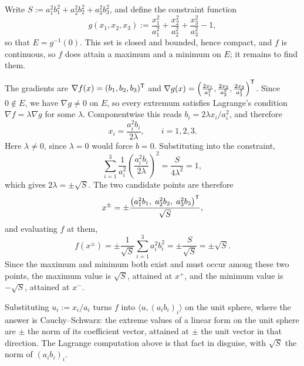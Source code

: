 \begin{exercisesolution}
\label{sol:lagrange_ellipsoid_linear}
Write $S := a_1^2 b_1^2 + a_2^2 b_2^2 + a_3^2 b_3^2$, and define the constraint function
\[g(x_1,x_2,x_3) := \frac{x_1^2}{a_1^2} + \frac{x_2^2}{a_2^2} + \frac{x_3^2}{a_3^2} - 1,\]
so that $E = g^{-1}(0)$. This set is closed and bounded, hence compact, and $f$ is continuous, so
$f$ does attain a maximum and a minimum on $E$; it remains to find them.

The gradients are $\nabla f(x) = (b_1, b_2, b_3)^{\mathsf{T}}$ and $\nabla g(x) = \left(\frac{2x_1}{a_1^2}, \frac{2x_2}{a_2^2}, \frac{2x_3}{a_3^2}\right)^{\mathsf{T}}$.
Since $0 \notin E$, we have $\nabla g \neq 0$ on $E$, so every extremum satisfies Lagrange's
condition $\nabla f = \lambda \nabla g$ for some $\lambda$. Componentwise this reads
$b_i = 2\lambda x_i / a_i^2$, and therefore
\[x_i = \frac{a_i^2 b_i}{2\lambda}, \qquad i = 1,2,3.\]
Here $\lambda \neq 0$, since $\lambda = 0$ would force $b = 0$. Substituting into the constraint,
\[\sum_{i=1}^3 \frac{1}{a_i^2} \left(\frac{a_i^2 b_i}{2\lambda}\right)^2 = \frac{S}{4\lambda^2} = 1,\]
which gives $2\lambda = \pm\sqrt{S}$. The two candidate points are therefore
\[x^{\pm} = \pm \frac{\big(a_1^2 b_1,\; a_2^2 b_2,\; a_3^2 b_3\big)^{\mathsf{T}}}{\sqrt{S}},\]
and evaluating $f$ at them,
\[f(x^{\pm}) = \pm \frac{1}{\sqrt{S}}\sum_{i=1}^3 a_i^2 b_i^2 = \pm \frac{S}{\sqrt{S}} = \pm\sqrt{S}.\]
Since the maximum and minimum both exist and must occur among these two points, the maximum value
is $\sqrt{S}$, attained at $x^{+}$, and the minimum value is $-\sqrt{S}$, attained at $x^{-}$.
\begin{remark}
Substituting $u_i := x_i/a_i$ turns $f$ into $\langle u, (a_ib_i)_i\rangle$ on the unit sphere, where
the answer is Cauchy--Schwarz: the extreme values of a linear form on the unit sphere are
$\pm$ the norm of its coefficient vector, attained at $\pm$ the unit vector in that direction. The
Lagrange computation above is that fact in disguise, with $\sqrt{S}$ the norm of $(a_ib_i)_i$.
\end{remark}
\end{exercisesolution}


